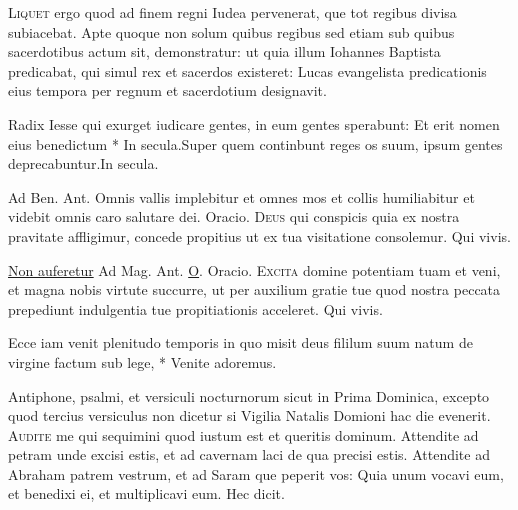 \begin{multicols*}{2}
\begin{responsory}
\end{responsory}
\lettrine[lines=2]{\zallmancaps \color{Blue} L}{iquet} ergo quod ad finem regni Iudea pervenerat, que tot regibus divisa subiacebat. Apte quoque non solum quibus regibus sed etiam sub quibus sacerdotibus actum sit, demonstratur: ut quia illum Iohannes Baptista predicabat, qui simul rex et sacerdos existeret: Lucas evangelista predicationis eius tempora per regnum et sacerdotium designavit.
\begin{responsory-final}
{Radix Iesse qui exurget iudicare gentes, in eum gentes sperabunt: Et erit nomen eius benedictum * In secula.}{Super quem continbunt reges os suum, ipsum gentes deprecabuntur.}{In secula.}
\end{responsory-final}
{\color{Red} Ad Ben. Ant.} Omnis vallis implebitur et omnes mos et collis humiliabitur et videbit omnis caro salutare dei. {\color{Red} Oracio.}
\lettrine[lines=2]{\zallmancaps \color{Red} D}{eus} qui conspicis quia ex nostra pravitate affligimur, concede propitius ut ex tua visitatione consolemur. Qui vivis.
{\color{Red} }
\par {} \R \hyperlink{non-auferetur}{Non auferetur} {\color{Red} Ad Mag. Ant.} \hyperlink{o-antiphons}{O}. {\color{Red} Oracio.}
\lettrine[lines=2]{\zallmancaps \color{Blue} E}{xcita} domine potentiam tuam et veni, et magna nobis virtute succurre, ut per auxilium gratie tue quod nostra peccata prepediunt indulgentia tue propitiationis acceleret. Qui vivis.
\begin{invitatory}[]
{Ecce iam venit plenitudo temporis in quo misit deus fililum suum natum de virgine factum sub lege, * Venite adoremus.}
\end{invitatory}
Antiphone, psalmi, et versiculi nocturnorum sicut in Prima Dominica, excepto quod tercius versiculus non dicetur si Vigilia Natalis Domioni hac die evenerit.
\lettrine[lines=2]{\zallmancaps \color{Red} A}{udite} me qui sequimini quod iustum est et queritis dominum. Attendite ad petram unde excisi estis, et ad cavernam laci de qua precisi estis. Attendite ad Abraham patrem vestrum, et ad Saram que peperit vos: Quia unum vocavi eum, et benedixi ei, et multiplicavi eum. Hec dicit.
\begin{responsory}

\end{responsory}
\end{multicols*}
